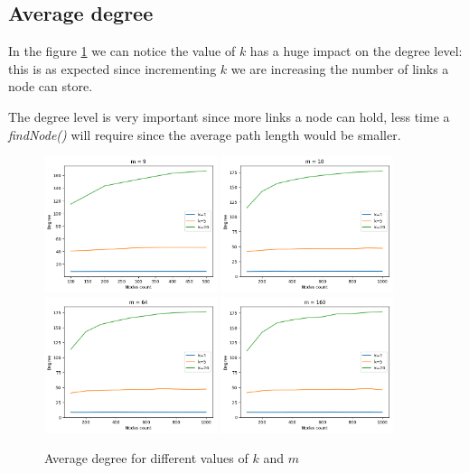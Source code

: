 \documentclass[12pt]{article}
\begin{document}
\subsection{Average degree}

In the figure \ref{fig:avg_degree} we can notice the value of $k$ has a huge impact on the degree level: this is as expected since incrementing $k$ we are increasing the number of links a node can store. 

\noindent
The degree level is very important since more links a node can hold, less time a \textit{findNode()} will require since the average path length would be smaller.

\begin{figure}[H]
    \centering
    \includegraphics[width=0.45\textwidth]{assets/avg_degree_m9.png} 
    \includegraphics[width=0.45\textwidth]{assets/avg_degree_m10.png} 
    \includegraphics[width=0.45\textwidth]{assets/avg_degree_m64.png}
    \includegraphics[width=0.45\textwidth]{assets/avg_degree_m160.png} 
    \caption{Average degree for different values of $k$ and $m$}
    \label{fig:avg_degree}
\end{figure}
\end{document}
